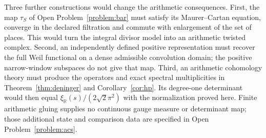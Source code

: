 Three further constructions would change the arithmetic consequences.
First, the map $\tau_S$ of Open Problem~\ref{problem:bar} must satisfy
its Maurer--Cartan equation, converge in the declared filtration and
commute with enlargement of the set of places. This would turn the
integral divisor model into an arithmetic twisted complex. Second,
an independently defined positive representation must recover the
full Weil functional on a dense admissible convolution domain;
the positive narrow-window subspaces do not give that map. Third,
an arithmetic cohomology theory must produce the operators and exact
spectral multiplicities in Theorem~\ref{thm:deninger} and
Corollary~\ref{cor:hp}. Its degree-one determinant would then equal
$\xi_{\mathbb R}(s)/(2\sqrt2\pi^2)$ with the normalization proved here.
Finite arithmetic gluing supplies no continuous gauge measure or
determinant map; those additional state and comparison data are
specified in Open Problem~\ref{problem:acs}.
